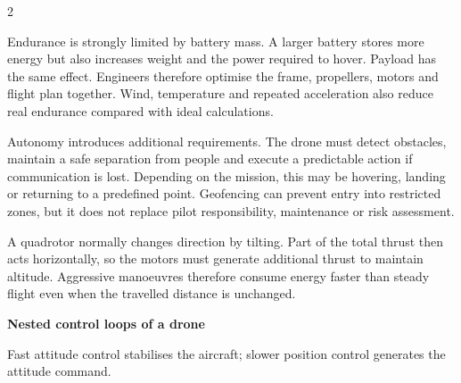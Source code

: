 \begin{multicols}{2}
\begin{ecarticle}
Endurance is strongly limited by battery mass. A larger battery stores more energy but also increases
weight and the power required to hover. Payload has the same effect. Engineers therefore optimise the
frame, propellers, motors and flight plan together. Wind, temperature and repeated acceleration also
reduce real endurance compared with ideal calculations.

Autonomy introduces additional requirements. The drone must detect obstacles, maintain a safe
separation from people and execute a predictable action if communication is lost. Depending on the
mission, this may be hovering, landing or returning to a predefined point. Geofencing can prevent
entry into restricted zones, but it does not replace pilot responsibility, maintenance or risk
assessment.
\end{ecarticle}

\begin{tcolorbox}[title=\sffamily\bfseries Engineering Insight,colback=yellow!10,colframe=ECOrange]
A quadrotor normally changes direction by tilting. Part of the total thrust then acts horizontally,
so the motors must generate additional thrust to maintain altitude. Aggressive manoeuvres therefore
consume energy faster than steady flight even when the travelled distance is unchanged.
\end{tcolorbox}

\begin{engineeringfocus}
\textbf{Nested control loops of a drone}
\begin{center}
\end{center}
Fast attitude control stabilises the aircraft; slower position control generates the attitude command.
\end{engineeringfocus}


\end{multicols}
